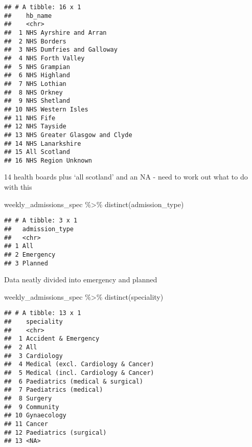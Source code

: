 \documentclass[
]{article}
\newenvironment{Shaded}{\begin{snugshade}}{\end{snugshade}}
\newcommand{\FunctionTok}[1]{\textcolor[rgb]{0.00,0.00,0.00}{#1}}
\newcommand{\NormalTok}[1]{#1}
\newcommand{\SpecialCharTok}[1]{\textcolor[rgb]{0.00,0.00,0.00}{#1}}
\begin{document}
\begin{verbatim}
## # A tibble: 16 x 1
##    hb_name                      
##    <chr>                        
##  1 NHS Ayrshire and Arran       
##  2 NHS Borders                  
##  3 NHS Dumfries and Galloway    
##  4 NHS Forth Valley             
##  5 NHS Grampian                 
##  6 NHS Highland                 
##  7 NHS Lothian                  
##  8 NHS Orkney                   
##  9 NHS Shetland                 
## 10 NHS Western Isles            
## 11 NHS Fife                     
## 12 NHS Tayside                  
## 13 NHS Greater Glasgow and Clyde
## 14 NHS Lanarkshire              
## 15 All Scotland                 
## 16 NHS Region Unknown
\end{verbatim}

14 health boards plus `all scotland' and an NA - need to work out what
to do with this

\begin{Shaded}
\begin{Highlighting}[]
\NormalTok{weekly\_admissions\_spec }\SpecialCharTok{\%\textgreater{}\%} 
  \FunctionTok{distinct}\NormalTok{(admission\_type)}
\end{Highlighting}
\end{Shaded}

\begin{verbatim}
## # A tibble: 3 x 1
##   admission_type
##   <chr>         
## 1 All           
## 2 Emergency     
## 3 Planned
\end{verbatim}

Data neatly divided into emergency and planned

\begin{Shaded}
\begin{Highlighting}[]
\NormalTok{weekly\_admissions\_spec }\SpecialCharTok{\%\textgreater{}\%} 
  \FunctionTok{distinct}\NormalTok{(speciality)}
\end{Highlighting}
\end{Shaded}

\begin{verbatim}
## # A tibble: 13 x 1
##    speciality                         
##    <chr>                              
##  1 Accident & Emergency               
##  2 All                                
##  3 Cardiology                         
##  4 Medical (excl. Cardiology & Cancer)
##  5 Medical (incl. Cardiology & Cancer)
##  6 Paediatrics (medical & surgical)   
##  7 Paediatrics (medical)              
##  8 Surgery                            
##  9 Community                          
## 10 Gynaecology                        
## 11 Cancer                             
## 12 Paediatrics (surgical)             
## 13 <NA>
\end{verbatim}
\end{document}
